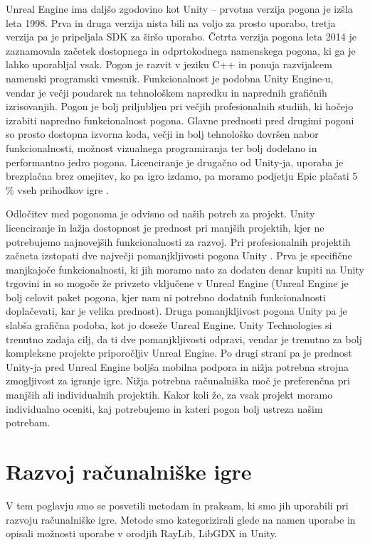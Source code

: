 \documentclass[12pt,a4paper,twoside]{book}
\begin{document}
Unreal Engine ima daljšo zgodovino kot Unity -- prvotna verzija pogona je izšla leta 1998. Prva in druga verzija nista bili na voljo za prosto uporabo, tretja verzija pa je pripeljala SDK za širšo uporabo. Četrta verzija pogona leta 2014 je zaznamovala začetek dostopnega in odprtokodnega namenskega pogona, ki ga je lahko uporabljal vsak. Pogon je razvit v jeziku C++ in ponuja razvijalcem namenski programski vmesnik. Funkcionalnost je podobna Unity Engine-u, vendar je večji poudarek na tehnološkem napredku in naprednih grafičnih izrisovanjih. Pogon je bolj priljubljen pri večjih profesionalnih studiih, ki hočejo izrabiti napredno funkcionalnost pogona. Glavne prednosti pred drugimi pogoni so prosto dostopna izvorna koda, večji in bolj tehnološko dovršen nabor funkcionalnosti, možnost vizualnega programiranja ter bolj dodelano in performantno jedro pogona. Licenciranje je drugačno od Unity-ja, uporaba je brezplačna brez omejitev, ko pa igro izdamo, pa moramo podjetju Epic plačati 5 \% vseh prihodkov igre \cite{unrealEngine}. 

Odločitev med pogonoma je odvisno od naših potreb za projekt. Unity licenciranje in lažja dostopnost je prednost pri manjših projektih, kjer ne potrebujemo najnovejših funkcionalnosti za razvoj. Pri profesionalnih projektih začneta izstopati dve največji pomanjkljivosti pogona Unity . Prva je specifične manjkajoče funkcionalnosti, ki jih moramo nato za dodaten denar kupiti na Unity trgovini in so mogoče že privzeto vključene v Unreal Engine (Unreal Engine je bolj celovit paket pogona, kjer nam ni potrebno dodatnih funkcionalnosti doplačevati, kar je velika prednost). Druga pomanjkljivost pogona Unity  pa je slabša grafična podoba, kot jo doseže Unreal Engine. Unity Technologies si trenutno zadaja cilj, da ti dve pomanjkljivosti odpravi, vendar je trenutno za bolj kompleksne projekte priporočljiv Unreal Engine. Po drugi strani pa je prednost Unity-ja pred Unreal Engine boljša mobilna podpora in nižja potrebna strojna zmogljivost za igranje igre. Nižja potrebna računalniška moč je preferenčna pri manjših ali individualnih projektih. Kakor koli že, za vsak projekt moramo individualno oceniti, kaj potrebujemo in kateri pogon bolj ustreza našim potrebam.
	
\chapter{Razvoj računalniške igre}\thispagestyle{fancy}
\label{chapter:razvojIger}
V tem poglavju smo se posvetili metodam in praksam, ki smo jih uporabili pri razvoju računalniške igre. Metode smo kategorizirali glede na namen uporabe in opisali možnosti uporabe v orodjih RayLib, LibGDX in Unity.
\end{document}
